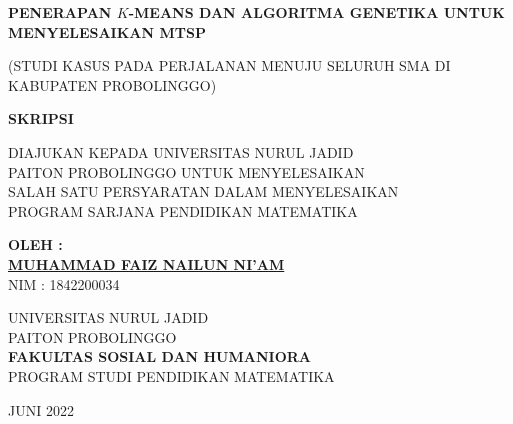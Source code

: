    
\begin{center}

\textbf{PENERAPAN $K$-MEANS DAN ALGORITMA GENETIKA UNTUK MENYELESAIKAN MTSP}
       
       (STUDI KASUS PADA PERJALANAN MENUJU SELURUH SMA DI KABUPATEN PROBOLINGGO) 
       
       \vfill
       \textbf{SKRIPSI}
       \vfill
       
       DIAJUKAN KEPADA UNIVERSITAS NURUL JADID \\
       PAITON PROBOLINGGO UNTUK MENYELESAIKAN \\ SALAH SATU PERSYARATAN DALAM MENYELESAIKAN \\ PROGRAM SARJANA PENDIDIKAN MATEMATIKA
       
       \vfill       
       
       \textbf{OLEH :}\\
       \textbf{\underline{MUHAMMAD FAIZ NAILUN NI'AM}}\\
       NIM : 1842200034

       \vfill
       
       UNIVERSITAS NURUL JADID\\
       PAITON PROBOLINGGO\\
     \textbf{FAKULTAS SOSIAL DAN HUMANIORA}\\       
       PROGRAM STUDI PENDIDIKAN MATEMATIKA\\
       
       \vfill       
       
       JUNI 2022
       
   \end{center}